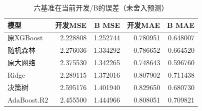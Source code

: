 \begin{table}[htbp]
\small
\setlength{\tabcolsep}{5pt}
\centering
\caption{六基准在当前开发/B的误差（未舍入预测）}
\label{tab:baseline-results}
\begin{tabular}{lrrrr}
\toprule
模型 & 开发MSE & B MSE & 开发MAE & B MAE \\
\midrule
原XGBoost & 2.228808 & 1.252744 & 0.780951 & 0.648007 \\
随机森林 & 2.276036 & 1.334292 & 0.786652 & 0.664520 \\
原大网络 & 2.375530 & 1.342265 & 0.748643 & 0.596760 \\
Ridge & 2.289115 & 1.372016 & 0.807902 & 0.711438 \\
决策树 & 2.595176 & 1.401940 & 0.829650 & 0.680730 \\
AdaBoost.R2 & 2.455500 & 1.444966 & 0.808051 & 0.709821 \\
\bottomrule
\end{tabular}
\end{table}
